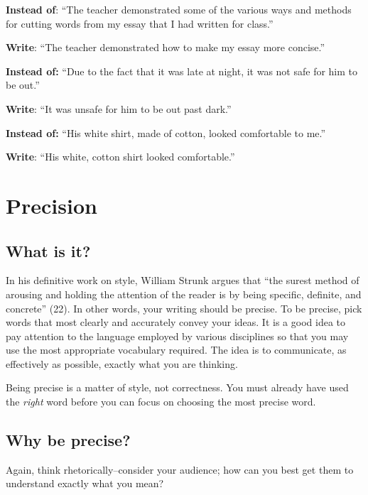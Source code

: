 \begin{enumerate}
    	\textbf{Instead of}:  	``The teacher demonstrated some of the various ways and methods
                               	for cutting words from my essay that I had written for class.''
 
    	\textbf{Write}:           	``The teacher demonstrated how to make my essay more concise.''
 
    	\textbf{Instead of:}  	``Due to the fact that it was late at night, it was not safe for him to
                                	be out.''
 
    	\textbf{Write}:                    	``It was unsafe for him to be out past dark.''
 
 
    	\textbf{Instead of:}  	``His white shirt, made of cotton, looked comfortable to me.''
 
    	\textbf{Write}:        	          	``His white, cotton shirt looked comfortable.''

\end{enumerate}

\chapter{Precision}
 
\section{What is it?}
 
In his definitive work on style, William Strunk argues that ``the surest method of arousing and holding the attention of the reader is by being specific, definite, and concrete'' (22). In other words, your writing should be precise. To be precise, pick words that most clearly and accurately convey your ideas.  It is a good idea to pay attention to the language employed by various disciplines so that you may use the most appropriate vocabulary required. The idea is to communicate, as effectively as possible, exactly what you are thinking.
 
Being precise is a matter of style, not correctness. You must already have used the \emph{right} word before you can focus on choosing the most precise word.
 
\section{Why be precise?}
 
Again, think rhetorically--consider your audience; how can you best get them to understand exactly what you mean?
 
